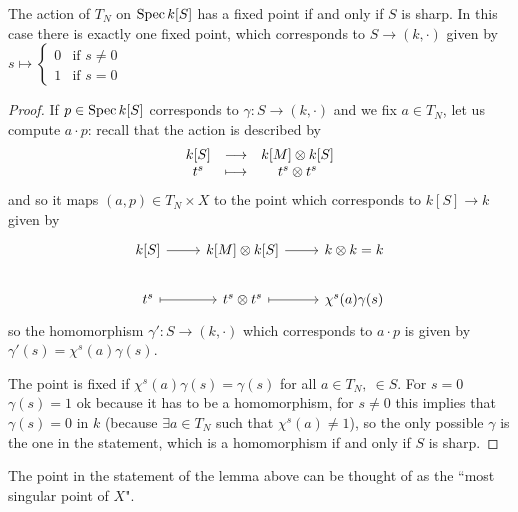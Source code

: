 \begin{lemma}[]\label{LmFixedPointForActionOfTorusInAffine}
The action of $T_N$ on $\operatorname{Spec} k[S]$ has a fixed point if and only if $S$ is sharp.
In this case there is exactly one fixed point, which corresponds to $S\to (k,\cdot)$ given by $s\mapsto \begin{cases}
	0&\text{if }s\neq 0\\
	1&\text{if }s=0
\end{cases}$
\end{lemma}
\begin{proof}
If $p\in \operatorname{Spec} k[S]$ corresponds to $\gamma:S\to (k,\cdot)$ and we fix $a\in T_N$, let us compute $a\cdot p$: recall that the action is described by
\[\begin{array}{ccc} {k[S]} & \longrightarrow & {k[M]\otimes k[S]}\\ {t^s} & \longmapsto & {t^s\otimes t^s} \end{array}\]
and so it maps $(a,p)\in T_N\times X$ to the point which corresponds to $k[S]\to k$ given by
\[\begin{tikzcd}
	{k[S]} & {k[M]\otimes k[S]} & {k\otimes k=k} \\
	{t^s} & {t^s\otimes t^s} & {\chi^s(a)\gamma(s)}
	\arrow[from=1-1, to=1-2]
	\arrow[from=1-2, to=1-3]
	\arrow[maps to, from=2-1, to=2-2]
	\arrow[maps to, from=2-2, to=2-3]
\end{tikzcd}\]
so the homomorphism $\gamma':S\to (k,\cdot)$ which corresponds to $a\cdot p$ is given by $\gamma'(s)=\chi^s(a)\gamma(s)$.

The point is fixed if $\chi^s(a)\gamma(s)=\gamma(s)$ for all $a\in T_N,\ \in S$. For $s= 0$ $\gamma(s)=1$ ok because it has to be a homomorphism, for $s\neq 0$ this implies that $\gamma(s)=0$ in $k$ (because $\exists a\in T_N$ such that $\chi^s(a)\neq 1$), so the only possible $\gamma$ is the one in the statement, which is a homomorphism if and only if $S$ is sharp.
\end{proof}

\begin{remark}
The point in the statement of the lemma above can be thought of as the ``most singular point of $X$".
\end{remark}	










